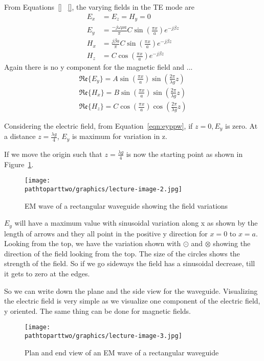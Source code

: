 From Equations~\eqref{} \textemdash\;~\eqref{}, the varying fields in the TE mode are
\begin{align*}
E_{x} &= E_{z} = H_{y} = 0\\
E_{y} &= \frac{-j\omega\mu a }{\pi} C\sin(\frac{\pi x}{a}) e ^{-j\beta z}\\
H_{x} &= \frac{j\beta a}{\pi} C \sin(\frac{\pi x}{a})e^{-j\beta z} \\
H_{z} &= C\cos(\frac{\pi x}{a}) e^{-j\beta z}
\end{align*}
Again there is no y component for the magnetic field and ...
\begin{align}
\mathfrak{Re}\{E_{y}\} = A\sin(\frac{\pi x}{a})\sin(\frac{2\pi}{\lambda g}z)
\label{eqn:eyppw}\\
\mathfrak{Re}\{H_{x}\} = B\sin(\frac{\pi x}{a})\sin(\frac{2\pi}{\lambda g}z)\\
\mathfrak{Re}\{H_{z}\} = C\cos(\frac{\pi x}{a})\cos(\frac{2\pi}{\lambda g}z)
\end{align}

Considering the electric field, from Equation~\eqref{eqn:eyppw}, if $z = 0, E_{y}$ is zero. At a distance $ z = \frac{\lambda g}{4}$, $E_{y}$ is maximum for variation in z.

If we move the origin such that $z = \frac{\lambda g}{4}$ is now the starting point as shown in Figure~\ref{fig:lectureimage2}.
\begin{figure}[h]
\centering
\texttt{[image: \\pathtoparttwo/graphics/lecture-image-2.jpg]}
\caption{EM wave of a rectangular waveguide showing the field variations}
\label{fig:lectureimage2}
\end{figure}

$E_{y}$ will have a maximum value with sinusoidal variation along x as shown by the length of arrows and they all point in the positive y direction for $x = 0$ to $x = a$. Looking from the top, we have the variation shown with $\odot$ and $\otimes$ showing the direction of the field looking from the top. The size of the circles shows the strength of the field. So if we go sideways the field has a sinusoidal decrease, till it gets to zero at the edges.
 
So we can write down the plane and the side view for the waveguide. Visualizing the electric field is very simple as we visualize one component of the electric field, y oriented. The same thing can be done for magnetic fields.
\begin{figure}[h]
\centering
\texttt{[image: \\pathtoparttwo/graphics/lecture-image-3.jpg]}
\caption{Plan and end view of an EM wave of a rectangular waveguide}
\label{fig:lectureimage3}
\end{figure}

